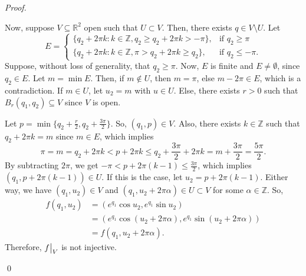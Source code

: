 \documentclass[12pt]{article}
\newenvironment{problem}[2][Problem]{\begin{trivlist}
\item[\hskip \labelsep {\bfseries #1}\hskip \labelsep {\bfseries
#2.}]}{\end{trivlist}}
\newenvironment{sol}
    {\emph{Proof.}
    }
    {
    \qed
    }
\newcommand\restr[2]{{%
  \left.\kern-\nulldelimiterspace %
  #1 %
  \vphantom{\big|} %
  \right|_{#2} %
  }}
\begin{document}
\begin{problem}{26}
\begin{itemize}
\begin{sol}
     \hspace{1em} Now, suppose $V \subseteq \mathbb{R}^2$ open such that $U \subset V$. Then, there exists $q \in V \setminus U$. Let $$E = \begin{cases} 
        \{q_2 + 2\pi k : k \in \mathbb{Z},q_2 \geq q_2 + 2\pi k > -\pi\}, & \text{if } q_2 \geq \pi \\
        \{q_2 + 2\pi k : k \in \mathbb{Z},\pi > q_2 + 2 \pi k \geq q_2\}, & \text{if } q_2 \leq -\pi.
     \end{cases}$$
      \hspace{1em} Suppose, without loss of generality, that $q_2 \geq \pi$. Now, $E$ is finite and $E \neq \emptyset$, since $q_2 \in E$. Let $m = \min E$. Then, if $m \not \in U$, then $m = \pi$, else $m - 2\pi \in E$, which is a contradiction. If $m \in U$, let $u_2 = m$ with $u \in U$. Else, there exists $r > 0$ such that $B_r(q_1,q_2) \subseteq V$ since $V$ is open.
      
      \hspace{1em} Let $p = \min\{q_2 + \frac{r}{2}, q_2 + \frac{3\pi}{2}\}$. So, $(q_1,p) \in V$. Also, there exists $k \in \mathbb{Z}$ such that $q_2 + 2 \pi k = m$ since $m \in E$, which implies $$\pi = m = q_2 + 2 \pi k < p + 2 \pi k \leq q_2 + \frac{3\pi}{2} + 2\pi k = m + \frac{3 \pi}{2} = \frac{5 \pi}{2}.$$ By subtracting $2 \pi$, we get $-\pi < p + 2 \pi (k-1) \leq \frac{3 \pi}{2}$, which implies $(q_1,p+2\pi (k-1)) \in U$. If this is the case, let $u_2 = p + 2 \pi (k-1)$. Either way, we have $(q_1,u_2) \in V$ and $(q_1,u_2 + 2 \pi \alpha) \in U \subset V$ for some $\alpha \in \mathbb{Z}$. So, \begin{align*}
          f(q_1,u_2) &= (e^{q_1}\cos u_2, e^{q_1} \sin u_2) \\ &= (e^{q_1} \cos (u_2 + 2 \pi \alpha),e^{q_1} \sin (u_2 + 2 \pi \alpha)) \\ &= f(q_1,u_2 + 2\pi \alpha).
      \end{align*}
      Therefore, $\restr{f}{V}$ is not injective.
      \end{sol}
  \end{itemize}
  \end{problem}
  
\end{document}
